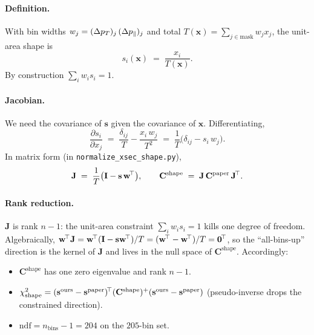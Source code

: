 \paragraph{Definition.}
With bin widths $w_{j} = (\Delta p_{T})_{j}\,(\Delta p_{\parallel})_{j}$ and total
$T(\mathbf{x}) = \sum_{j\in\text{mask}} w_{j}x_{j}$, the unit-area
shape is
\begin{equation}
s_{i}(\mathbf{x}) \;=\; \frac{x_{i}}{T(\mathbf{x})}.
\end{equation}
By construction $\sum_{i} w_{i} s_{i} = 1$.

\paragraph{Jacobian.}
We need the covariance of $\mathbf{s}$ given the covariance of
$\mathbf{x}$. Differentiating,
\begin{equation}
\frac{\partial s_{i}}{\partial x_{j}}
\;=\;
\frac{\delta_{ij}}{T} - \frac{x_{i}\,w_{j}}{T^{2}}
\;=\;
\frac{1}{T}\big(\delta_{ij} - s_{i}\,w_{j}\big).
\end{equation}
In matrix form (in \texttt{normalize\_xsec\_shape.py}),
\begin{equation}
\mathbf{J} \;=\; \frac{1}{T}\big(\mathbf{I} - \mathbf{s}\,\mathbf{w}^{\!\top}\big),
\qquad
\mathbf{C}^{\text{shape}} \;=\; \mathbf{J}\,\mathbf{C}^{\text{paper}}\,\mathbf{J}^{\!\top}.
\end{equation}

\paragraph{Rank reduction.}
$\mathbf{J}$ is rank $n-1$: the unit-area constraint $\sum_{i} w_{i}
s_{i} = 1$ kills one degree of freedom. Algebraically,
$\mathbf{w}^{\!\top}\mathbf{J} = \mathbf{w}^{\!\top}(\mathbf{I}-\mathbf{s}\mathbf{w}^{\!\top})/T
= (\mathbf{w}^{\!\top} - \mathbf{w}^{\!\top})/T = \mathbf{0}^{\!\top}$, so the
``all-bins-up'' direction is the kernel of $\mathbf{J}$ and lives in
the null space of $\mathbf{C}^{\text{shape}}$. Accordingly:
\begin{itemize}[nosep]
  \item $\mathbf{C}^{\text{shape}}$ has one zero eigenvalue and rank $n-1$.
  \item $\chi^{2}_{\text{shape}} = (\mathbf{s}^{\text{ours}}-\mathbf{s}^{\text{paper}})^{\!\top}
        (\mathbf{C}^{\text{shape}})^{+} (\mathbf{s}^{\text{ours}}-\mathbf{s}^{\text{paper}})$
        (pseudo-inverse drops the constrained direction).
  \item $\mathrm{ndf} = n_{\text{bins}} - 1 = 204$ on the
        $205$-bin set.
\end{itemize}

